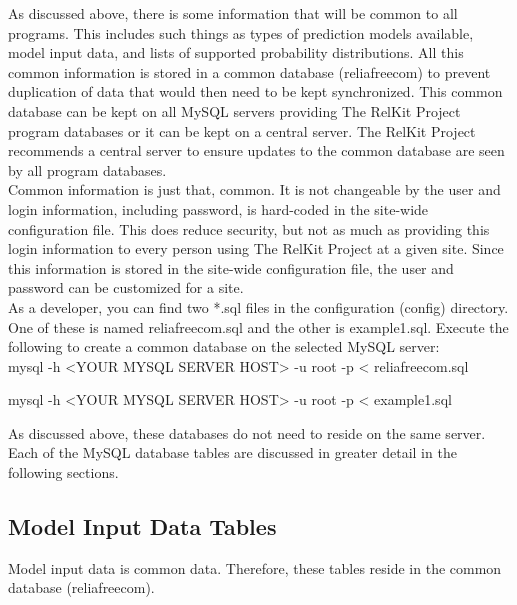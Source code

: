 \documentclass[11pt, 12pt, twoside, onecolumn]{article}
\begin{document}
\noindent As discussed above, there is some information that will be common to all programs.  This includes such things as types of prediction models available, model input data, and lists of supported probability distributions.  All this common information is stored in a common database (reliafreecom) to prevent duplication of data that would then need to be kept synchronized.  This common database can be kept on all MySQL servers providing The RelKit Project program databases or it can be kept on a central server.  The RelKit Project recommends a central server to ensure updates to the common database are seen by all program databases. \\

\noindent Common information is just that, common.  It is not changeable by the user and login information, including password, is hard-coded in the site-wide configuration file.  This does reduce security, but not as much as providing this login information to every person using The RelKit Project at a given site.  Since this information is stored in the site-wide configuration file, the user and password can be customized for a site. \\

\noindent As a developer, you can find two *.sql files in the configuration (config) directory.  One of these is named reliafreecom.sql and the other is example1.sql.  Execute the following to create a common database on the selected MySQL server: \\

    mysql -h <YOUR MYSQL SERVER HOST> -u root -p < reliafreecom.sql

    mysql -h <YOUR MYSQL SERVER HOST> -u root -p < example1.sql

\bigskip \noindent As discussed above, these databases do not need to reside on the same server.  Each of the MySQL database tables are discussed in greater detail in the following sections.

\subsection{\bf \large Model Input Data Tables}

\noindent Model input data is common data.  Therefore, these tables reside in the common database (reliafreecom). \\
\end{document}
